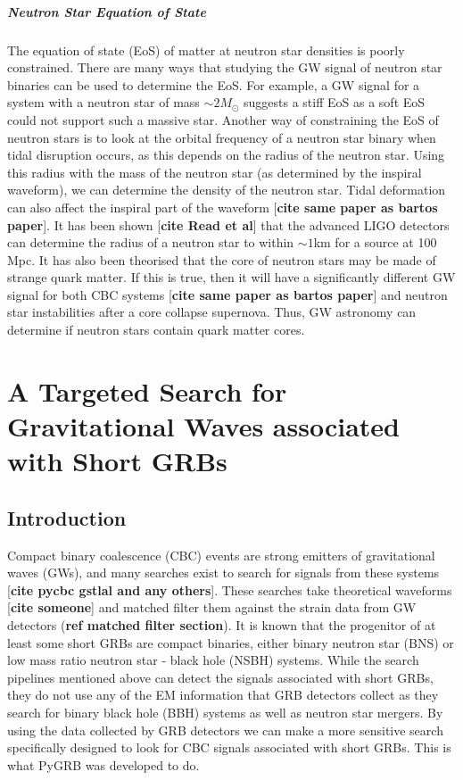 \documentclass[11pt]{cuthesis}
\begin{document}
\paragraph{Neutron Star Equation of State}
The equation of state (EoS) of matter at neutron star densities is poorly constrained. There are many ways that studying the GW signal of neutron star binaries can be used to determine the EoS. For example, a GW signal for a system with a neutron star of mass $\sim 2M_\odot$ suggests a stiff EoS as a soft EoS could not support such a massive star. Another way of constraining the EoS of neutron stars is to look at the orbital frequency of a neutron star binary when tidal disruption occurs, as this depends on the radius of the neutron star. Using this radius with the mass of the neutron star (as determined by the inspiral waveform), we can determine the density of the neutron star. Tidal deformation can also affect the inspiral part of the waveform [\textbf{cite same paper as bartos paper}]. It has been shown [\textbf{cite Read et al}] that the advanced LIGO detectors can determine the radius of a neutron star to within $\sim 1$km for a source at 100 Mpc. It has also been theorised that the core of neutron stars may be made of strange quark matter. If this is true, then it will have a significantly different GW signal for both CBC systems [\textbf{cite same paper as bartos paper}] and neutron star instabilities after a core collapse supernova. Thus, GW astronomy can determine if neutron stars contain quark matter cores. 


\chapter{A Targeted Search for Gravitational Waves associated with Short GRBs} \label{chap: CBC}
\section{Introduction}\label{CBCintro}
Compact binary coalescence (CBC) events are strong emitters of gravitational waves (GWs), and many searches exist to search for signals from these systems [\textbf{cite pycbc gstlal and any others}]. These searches take theoretical waveforms [\textbf{cite someone}] and matched filter them against the strain data from GW detectors (\textbf{ref matched filter section}). It is known that the progenitor of at least some short GRBs are compact binaries, either binary neutron star (BNS) or low mass ratio neutron star - black hole (NSBH) systems. While the search pipelines mentioned above can detect the signals associated with short GRBs, they do not use any of the EM information that GRB detectors collect as they search for binary black hole (BBH) systems as well as neutron star mergers. By using the data collected by GRB detectors we can make a more sensitive search specifically designed to look for CBC signals associated with short GRBs. This is what PyGRB was developed to do.
\end{document}
